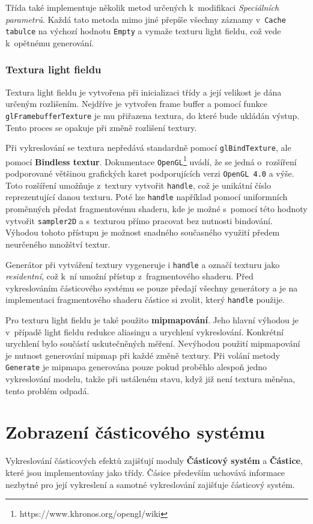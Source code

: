 Třída také implementuje několik metod určených k~modifikaci \emph{Speciálních parametrů}. Každá tato metoda mimo jiné přepíše všechny záznamy v~\texttt{Cache tabulce} na výchozí hodnotu \texttt{Empty} a vymaže texturu light fieldu, což vede k~opětnému generování.


\subsubsection*{Textura light fieldu}
Textura light fieldu je vytvořena při inicializaci třídy a její velikost je dána určeným rozlišením. Nejdříve je vytvořen frame buffer a pomocí funkce \texttt{glFramebufferTexture} je mu přiřazena textura, do které bude ukládán výstup. Tento proces se opakuje při změně rozlišení textury. 

Při vykreslování se textura nepředává standardně pomocí \texttt{glBindTexture}, ale pomocí \textbf{Bindless textur}. Dokumentace \texttt{OpenGL}\footnote{https://www.khronos.org/opengl/wiki} uvádí, že se jedná o~rozšíření podporované většinou grafických karet podporujících verzi \texttt{OpenGL 4.0} a výše. Toto rozšíření umožňuje z~textury vytvořit \texttt{handle}, což je unikátní číslo reprezentující danou texturu. Poté lze \texttt{handle} například pomocí uniformních proměnných  předat fragmentovému shaderu, kde je možné s~pomocí této hodnoty vytvořit \texttt{sampler2D} a s~texturou přímo pracovat bez nutnosti bindování. Výhodou tohoto přístupu je možnost snadného současného využití předem neurčeného množštví textur.

Generátor při vytváření textury vygeneruje i \texttt{handle} a označí texturu jako \emph{residentní}, což k~ní umožní přístup z~fragmentového shaderu. Před vykreslováním částicového systému se pouze předají všechny generátory a je na implementaci fragmentového shaderu částice si zvolit, který \texttt{handle} použije. 

Pro texturu light fieldu je také použito \textbf{mipmapování}. Jeho hlavní výhodou je v~případě light fieldu redukce aliasingu a urychlení vykreslování. Konkrétní urychlení bylo součástí uskutečněných měření. Nevýhodou použití mipmapování je nutnost generování mipmap při každé změně textury. Při volání metody \texttt{Generate} je mipmapa generována pouze pokud proběhlo alespoň jedno vykreslování modelu, takže při ustáleném stavu, když již není textura měněna, tento problém odpadá.

\section{Zobrazení částicového systému}
Vykreslování částicových efektů zajišťují moduly \textbf{Částicový systém} a \textbf{Částice}, které jsou implementovány jako třídy. Čásice především uchovává informace nezbytné pro její vykreslení a samotné vykreslování zajišťuje částicový systém. 

